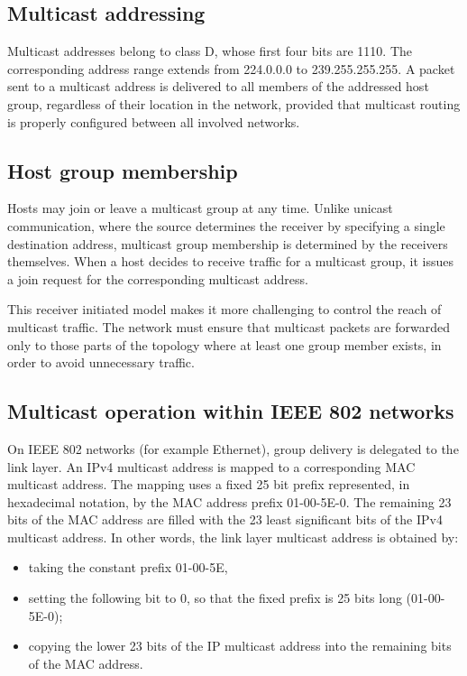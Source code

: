 \documentclass[11pt,a4paper,openany]{report}
\begin{document}
\subsection{Multicast addressing}

Multicast addresses belong to class D, whose first four bits are 1110. The corresponding address range extends from 224.0.0.0 to 239.255.255.255. A packet sent to a multicast address is delivered to all members of the addressed host group, regardless of their location in the network, provided that multicast routing is properly configured between all involved networks.

\subsection{Host group membership}

Hosts may join or leave a multicast group at any time. Unlike unicast communication, where the source determines the receiver by specifying a single destination address, multicast group membership is determined by the receivers themselves. When a host decides to receive traffic for a multicast group, it issues a join request for the corresponding multicast address.

This receiver initiated model makes it more challenging to control the reach of multicast traffic. The network must ensure that multicast packets are forwarded only to those parts of the topology where at least one group member exists, in order to avoid unnecessary traffic.

\subsection{Multicast operation within IEEE 802 networks}

On IEEE 802 networks (for example Ethernet), group delivery is delegated to the link layer. An IPv4 multicast address is mapped to a corresponding MAC multicast address. The mapping uses a fixed 25 bit prefix represented, in hexadecimal notation, by the MAC address prefix 01-00-5E-0. The remaining 23 bits of the MAC address are filled with the 23 least significant bits of the IPv4 multicast address. In other words, the link layer multicast address is obtained by:

\begin{itemize}
\item taking the constant prefix 01-00-5E,
\item setting the following bit to 0, so that the fixed prefix is 25 bits long (01-00-5E-0);
\item copying the lower 23 bits of the IP multicast address into the remaining bits of the MAC address.
\end{itemize}
\end{document}
